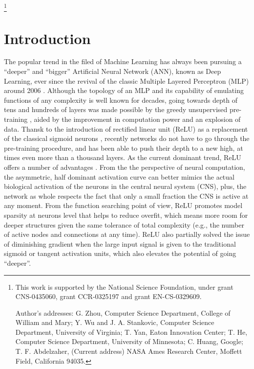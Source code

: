 \documentclass[acmtog, authorversion]{acmart}
\begin{document}



\thanks{This work is supported by the National Science Foundation,
  under grant CNS-0435060, grant CCR-0325197 and grant EN-CS-0329609.

  Author's addresses: G. Zhou, Computer Science Department, College of
  William and Mary; Y. Wu {and} J. A. Stankovic, Computer Science
  Department, University of Virginia; T. Yan, Eaton Innovation Center;
  T. He, Computer Science Department, University of Minnesota; C.
  Huang, Google; T. F. Abdelzaher, (Current address) NASA Ames
  Research Center, Moffett Field, California 94035.}


\maketitle


\section{Introduction}
The popular trend in the filed of Machine Learning has always been pursuing a ``deeper'' and ``bigger'' Artificial Neural Network (ANN), known as Deep Learning, ever since the revival of the classic Multiple Layered Perceptron (MLP) around 2006 \cite{DL:Intro1}. Although the topology of an MLP and its capability of emulating functions of any complexity is well known for decades, going towards depth of tens and hundreds of layers was made possible by the greedy unsupervised pre-training \cite{DL:Intro1}, aided by the improvement in computation power and an explosion of data. Thansk to the introduction of rectified linear unit (ReLU) as a replacement of the classical sigmoid neurons \cite{DL:Relu1}, recently networks do not have to go through the pre-training procedure, and has been able to push their depth to a new high, at times even more than a thousand layers. As the current dominant trend, ReLU offers a number of advantages \cite{DL:Relu1}. From the the perspective of neural computation, the asymmetric, half dominant activation curve can better mimics the actual biological activation of the neurons in the central neural system (CNS), plus, the network as whole respects the fact that only a small fraction the CNS is active at any moment\cite{DL:Relu1}. From the function searching point of view, ReLU promotes model sparsity at neurons level that helps to reduce overfit, which means more room for deeper structures given the same tolerance of total complexity (e.g., the number of active nodes and connections at any time). ReLU also partially solved the issue of diminishing gradient when the large input signal is given to the traditional sigmoid or tangent activation units, which also elevates the potential of going ``deeper''. 
\end{document}
